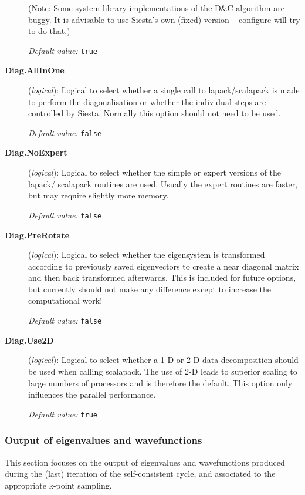 \documentclass[11pt]{article}
\begin{document}
\begin{description}
(Note: Some system library implementations of the D\&C algorithm are
buggy. It is advisable to use Siesta's own (fixed) version -- configure will
try to do that.)

{\it Default value:} {\tt true}

\item[{\bf Diag.AllInOne}] ({\it logical}): 
Logical to select whether a single call to lapack/scalapack is made to 
perform the diagonalisation or whether the individual steps are controlled
by {\sc Siesta}. Normally this option should not need to be used.

{\it Default value:} {\tt false}

\item[{\bf Diag.NoExpert}] ({\it logical}): 
Logical to select whether the simple or expert versions of the lapack/
scalapack routines are used. Usually the expert routines are faster, but
may require slightly more memory.

{\it Default value:} {\tt false}

\item[{\bf Diag.PreRotate}] ({\it logical}): 
Logical to select whether the eigensystem is transformed according to 
previously saved eigenvectors to create a near diagonal matrix and then 
back transformed afterwards. This is included for future options, but
currently should not make any difference except to increase the 
computational work!

{\it Default value:} {\tt false}

\item[{\bf Diag.Use2D}] ({\it logical}): 
Logical to select whether a 1-D or 2-D data decomposition should be used
when calling scalapack. The use of 2-D leads to superior scaling to 
large numbers of processors and is therefore the default. This option 
only influences the parallel performance.

{\it Default value:} {\tt true}

\end{description}

\subsubsection{Output of eigenvalues and wavefunctions}

This section focuses on the output of eigenvalues and wavefunctions
produced during the (last) iteration of the self-consistent cycle, 
and associated to the appropriate k-point sampling.
\end{document}
